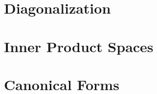 \documentclass{report}
\theoremstyle{definition}
\begin{document}
\chapter{Diagonalization}





\chapter{Inner Product Spaces}












\chapter{Canonical Forms}








\end{document}
